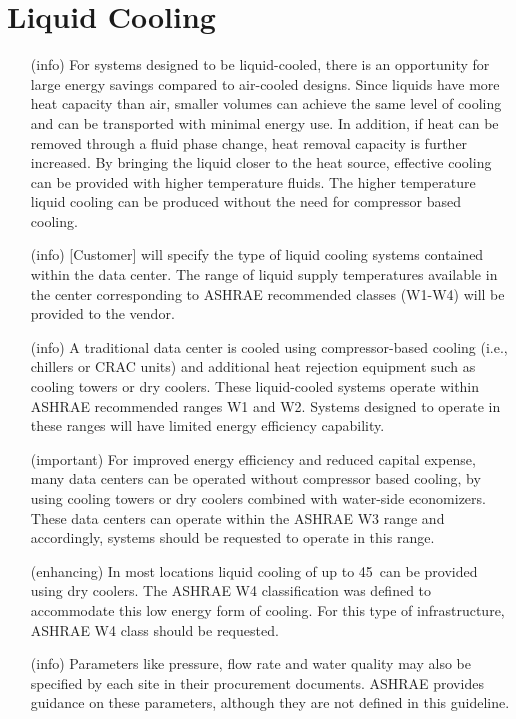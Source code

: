 \section{Liquid Cooling}
\begin{itemize}
\item[(info)]
For systems designed to be liquid-cooled, there is an opportunity for large energy savings compared to air-cooled designs.  Since liquids have more heat capacity than air, smaller volumes can achieve the same level of cooling and can be transported with minimal energy use.  In addition, if heat can be removed through a fluid phase change, heat removal capacity is further increased.  By bringing the liquid closer to the heat source, effective cooling can be provided with higher temperature fluids.  The higher temperature liquid cooling can be produced without the need for compressor based cooling.

\item[(info)]
[Customer] will specify the type of liquid cooling systems contained within the data center.  The range of liquid supply temperatures available in the center corresponding to ASHRAE recommended classes (W1-W4) will be provided to the vendor.  

\item[(info)]
A traditional data center is cooled using compressor-based cooling (i.e., chillers or CRAC units) and additional heat rejection equipment such as cooling towers or dry coolers.  These liquid-cooled systems operate within ASHRAE recommended ranges W1 and W2.  Systems designed to operate in these ranges will have limited energy efficiency capability.

\item[(important)]
For improved energy efficiency and reduced capital expense, many data centers can be operated without compressor based cooling, by using cooling towers or dry coolers combined with water-side economizers. These data centers can operate within the ASHRAE W3 range and accordingly, systems should be requested to operate in this range.

\item[(enhancing)]
In most locations liquid cooling of up to 45\celsius~can be provided using dry coolers.  The ASHRAE W4 classification was defined to accommodate this low energy form of cooling.  For this type of infrastructure, ASHRAE W4 class should be requested.  

\item[(info)]
Parameters like pressure, flow rate and water quality may also be specified by each site in their procurement documents.  ASHRAE provides guidance on these parameters, although they are not defined in this guideline. 
\end{itemize}
 
